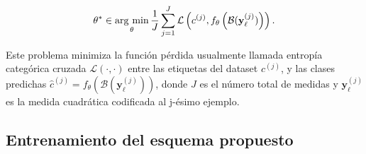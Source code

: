 \begin{equation}
    \mathbf{\theta}^* \in  \operatorname*{arg \ min}_{\mathbf{\theta}} \frac{1}{J}\sum_{j = 1}^{J} \mathcal{L}\left( c^{(j)}, f_{\mathbf{\theta}}\left(\mathcal{B}(\mathbf{y}_{\ell}^{(j)})\right)\right).
    \label{eq:dl_optimization}
\end{equation}

Este problema minimiza la función pérdida usualmente llamada entropía categórica cruzada $\mathcal{L}(\cdot, \cdot)$ entre las etiquetas del dataset $c^{(j)}$, y las clases predichas $\hat{c}^{(j)} = f_\theta(\mathcal{B}(\mathbf{y}_\ell^{(j)}))$, donde $J$ es el número total de medidas y $\mathbf{y}_\ell^{(j)}$ es la medida cuadrática codificada al  j-ésimo ejemplo.


\subsection{Entrenamiento del esquema propuesto}

